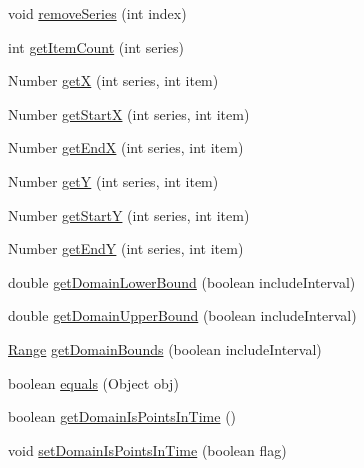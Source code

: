 \begin{DoxyCompactItemize}
\item 
void \mbox{\hyperlink{classorg_1_1jfree_1_1data_1_1time_1_1_time_period_values_collection_a7db30a1ea121b62247779ab7a6a2f505}{remove\+Series}} (int index)
\item 
int \mbox{\hyperlink{classorg_1_1jfree_1_1data_1_1time_1_1_time_period_values_collection_aaa63a2c05b1a61f655cc24115fcdd63e}{get\+Item\+Count}} (int series)
\item 
Number \mbox{\hyperlink{classorg_1_1jfree_1_1data_1_1time_1_1_time_period_values_collection_ac857f32843f8ae8ed8e27d15fd313606}{getX}} (int series, int item)
\item 
Number \mbox{\hyperlink{classorg_1_1jfree_1_1data_1_1time_1_1_time_period_values_collection_aa36a15fdb6ff28968edd997f317c27c5}{get\+StartX}} (int series, int item)
\item 
Number \mbox{\hyperlink{classorg_1_1jfree_1_1data_1_1time_1_1_time_period_values_collection_a4d271b09fd7d054b9d55b751ccfa73f4}{get\+EndX}} (int series, int item)
\item 
Number \mbox{\hyperlink{classorg_1_1jfree_1_1data_1_1time_1_1_time_period_values_collection_a505d89600471d16e572dffeaa4d349ec}{getY}} (int series, int item)
\item 
Number \mbox{\hyperlink{classorg_1_1jfree_1_1data_1_1time_1_1_time_period_values_collection_ad2e6b7fc456ccf6b7492c720f722198e}{get\+StartY}} (int series, int item)
\item 
Number \mbox{\hyperlink{classorg_1_1jfree_1_1data_1_1time_1_1_time_period_values_collection_a79bc6031731fb19cb9c1aa7fd605a951}{get\+EndY}} (int series, int item)
\item 
double \mbox{\hyperlink{classorg_1_1jfree_1_1data_1_1time_1_1_time_period_values_collection_adfb18911920ee6e9f74eae3357741461}{get\+Domain\+Lower\+Bound}} (boolean include\+Interval)
\item 
double \mbox{\hyperlink{classorg_1_1jfree_1_1data_1_1time_1_1_time_period_values_collection_a254bd47cf2e1576a887592818fd5269e}{get\+Domain\+Upper\+Bound}} (boolean include\+Interval)
\item 
\mbox{\hyperlink{classorg_1_1jfree_1_1data_1_1_range}{Range}} \mbox{\hyperlink{classorg_1_1jfree_1_1data_1_1time_1_1_time_period_values_collection_a724b7598d02651f029fe910753fbbe86}{get\+Domain\+Bounds}} (boolean include\+Interval)
\item 
boolean \mbox{\hyperlink{classorg_1_1jfree_1_1data_1_1time_1_1_time_period_values_collection_a912431c29a4a611028af7844ab0dccdb}{equals}} (Object obj)
\item 
boolean \mbox{\hyperlink{classorg_1_1jfree_1_1data_1_1time_1_1_time_period_values_collection_ae6f476983f920ca19656d092894f653f}{get\+Domain\+Is\+Points\+In\+Time}} ()
\item 
void \mbox{\hyperlink{classorg_1_1jfree_1_1data_1_1time_1_1_time_period_values_collection_a6b02c47571098c6cec37871815af991a}{set\+Domain\+Is\+Points\+In\+Time}} (boolean flag)
\end{DoxyCompactItemize}

